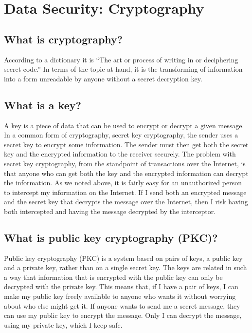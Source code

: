 \section{Data Security: Cryptography}
\label{data_crypto}

\subsection{What is cryptography?}
According to a dictionary it is ``The art or process of writing in or
deciphering secret code.'' In terms of the topic at hand, it is the
transforming of information into a form unreadable by anyone without a
secret decryption key.


\subsection{What is a key?}
A key is a piece of data that can be used to encrypt or decrypt a given
message.\\

In a common form of cryptography, secret key cryptography, the sender
uses a secret key to encrypt some information. The sender must then get
both the secret key and the encrypted information to the receiver
securely. The problem with secret key cryptography, from the standpoint
of transactions over the Internet, is that anyone who can get both the
key and the encrypted information can decrypt the information. As we
noted above, it is fairly easy for an unauthorized person to intercept
my information on the Internet. If I send both an encrypted message and
the secret key that decrypts the message over the Internet, then I risk
having both intercepted and having the message decrypted by the
interceptor.


\subsection{What is public key cryptography (PKC)?}
Public key cryptography (PKC) is a system based on pairs of keys, a
public key and a private key, rather than on a single secret key. The
keys are related in such a way that information that is encrypted with
the public key can only be decrypted with the private key. This means
that, if I have a pair of keys, I can make my public key freely
available to anyone who wants it without worrying about who else might
get it. If anyone wants to send me a secret message, they can use my
public key to encrypt the message. Only I can decrypt the message,
using my private key, which I keep safe.\\

